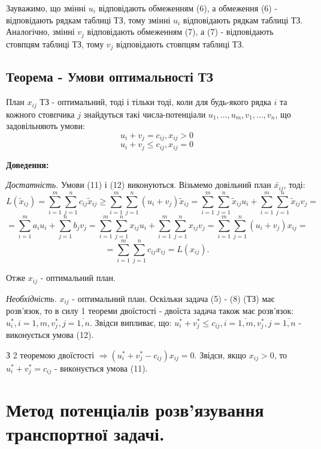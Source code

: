 \documentclass[12pt,a4paper]{article}
\begin{document}
Зауважимо, що змінні $u_i$ відповідають обмеженням (6), а обмеження (6) - відповідають рядкам таблиці ТЗ, тому змінні $u_i$ відповідають рядкам таблиці ТЗ. Аналогічно, змінні $v_j$ відповідають обмеженням (7), а (7) - відповідають стовпцям таблиці ТЗ, тому $v_j$ відповідають стовпцям таблиці ТЗ.

\subsection{Теорема - Умови оптимальності ТЗ}

План $x_{ij}$ ТЗ - оптимальний, тоді і тільки тоді, коли для будь-якого рядка $i$ та кожного стовпчика $j$ знайдуться такі числа-потенціали $u_1,\dots,u_m,v_1,\dots,v_n$, що задовільняють умови:
\begin{equation} u_i+v_j = c_{ij}, x_{ij}>0 \end{equation}
\begin{equation} u_i+v_j \leq c_{ij}, x_{ij}=0 \end{equation}

{\bf Доведення:}

{\it Достатність.} Умови (11) і (12) виконуються. Візьмемо довільний план $\tilde{x_{ij}}$, тоді:\\
$$ L(\tilde{x}_{ij}) = \sum_{i=1}^m \sum_{j=1}^n c_{ij} \tilde{x}_{ij} \geq
 \sum_{i=1}^m \sum_{j=1}^n (u_i+v_j) \tilde{x}_{ij} = 
 \sum_{i=1}^m \sum_{j=1}^n \tilde{x}_{ij} u_i + \sum_{i=1}^m \sum_{j=1}^n  \tilde{x}_{ij} v_j = $$
$$ = \sum_{i=1}^m a_i u_i + \sum_{j=1}^n b_j v_j =
 \sum_{i=1}^m \sum_{j=1}^n x_{ij} u_i + \sum_{i=1}^m \sum_{j=1}^n  x_{ij} v_j =
 \sum_{i=1}^m \sum_{j=1}^n (u_i+v_j) x_{ij} = $$
$$ = \sum_{i=1}^m \sum_{j=1}^n c_{ij} x_{ij} = L(x_{ij}). $$

Отже $x_{ij}$ - оптимальний план.

{\it Необхідність.} $x_{ij}$ - оптимальний план. Оскільки задача (5) - (8) (ТЗ) має розв’язок, то в силу 1 теореми двоїстості - двоїста задача також має розв’язок: $u^*_i, i = \overline{1,m}, v^*_j, j= \overline{1,n}$. Звідси випливає, що: $u^*_i+v^*_j \leq c_{ij}, i = \overline{1,m}, v^*_j, j= \overline{1,n}$ - виконується умова (12).

З 2 теоремою двоїстості $\Rightarrow (u^*_i + v^*_j - c_{ij})x_{ij}=0$. Звідси, якщо $x_{ij}>0$, то $u^*_i + v^*_j = c_{ij}$ - виконується умова (11).

\clearpage

\section{Метод потенціалів розв'язування транспортної задачі.}
\end{document}
